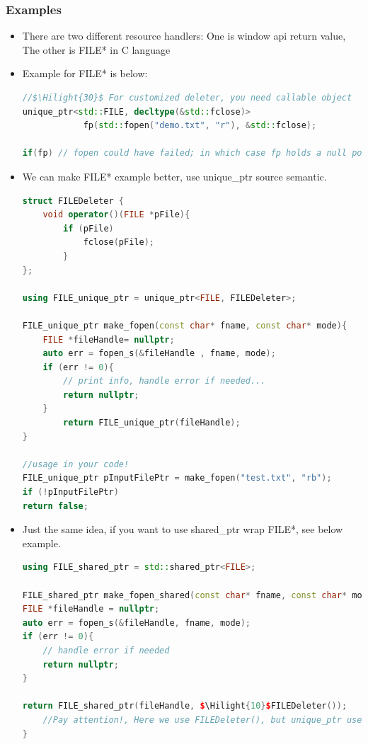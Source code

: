 \documentclass[a4paper,12pt,twoside]{book}
\newcommand{\Hilight}[1]{\makebox[0pt][l]{\color{yellow}\rule[-3pt]{#1em}{11pt}}}
\begin{document}
\subsubsection{Examples}
\begin{itemize}
	\item There are two different resource handlers: One is window api return value, The other is FILE* in C language
	
	\item Example for FILE* is below:
	
\begin{lstlisting}[frame=single, language=c++]
//$\Hilight{30}$ For customized deleter, you need callable object
unique_ptr<std::FILE, decltype(&std::fclose)> 
			fp(std::fopen("demo.txt", "r"), &std::fclose);
			
if(fp) // fopen could have failed; in which case fp holds a null pointer
\end{lstlisting}
	
	\item We can make FILE* example better, use unique\_ptr source semantic.
\begin{lstlisting}[frame=single, language=c++]
struct FILEDeleter {
	void operator()(FILE *pFile){
		if (pFile)
			fclose(pFile);
		}
};
	
using FILE_unique_ptr = unique_ptr<FILE, FILEDeleter>;
	
FILE_unique_ptr make_fopen(const char* fname, const char* mode){
	FILE *fileHandle= nullptr;
	auto err = fopen_s(&fileHandle , fname, mode); 
	if (err != 0){
		// print info, handle error if needed...
		return nullptr;
	}
		return FILE_unique_ptr(fileHandle);
}
	
//usage in your code!
FILE_unique_ptr pInputFilePtr = make_fopen("test.txt", "rb");
if (!pInputFilePtr)
return false;
\end{lstlisting}
	
\item Just the same idea, if you want to use shared\_ptr wrap FILE*, see below example.
\begin{lstlisting}[frame=single, language=c++]
using FILE_shared_ptr = std::shared_ptr<FILE>;
	
FILE_shared_ptr make_fopen_shared(const char* fname, const char* mode){
FILE *fileHandle = nullptr;
auto err = fopen_s(&fileHandle, fname, mode);
if (err != 0){
	// handle error if needed
	return nullptr;
}
	
return FILE_shared_ptr(fileHandle, $\Hilight{10}$FILEDeleter());
	//Pay attention!, Here we use FILEDeleter(), but unique_ptr use FILEDeleter
}
\end{lstlisting}
	

\end{itemize}
\end{document}
